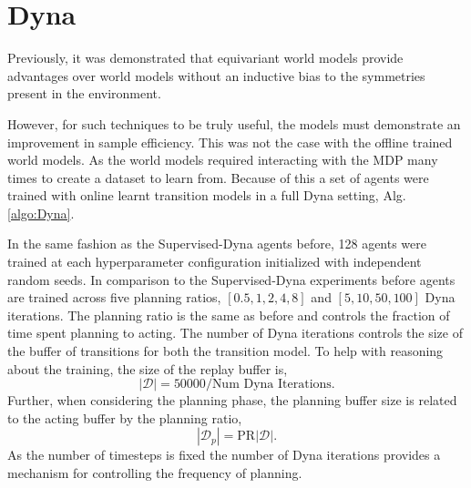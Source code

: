 \section{Dyna}\label{sec:Dyna_experiment}
Previously, it was demonstrated that equivariant world models provide advantages over world models without an inductive bias to the symmetries present in the environment.

However, for such techniques to be truly useful, the models must demonstrate an improvement in sample efficiency. This was not the case with the offline trained world models. As the world models required interacting with the MDP many times to create a dataset to learn from. Because of this a set of agents were trained with online learnt transition models in a full Dyna setting, Alg.\ref{algo:Dyna}.

In the same fashion as the Supervised-Dyna agents before, 128 agents were trained at each hyperparameter configuration initialized with independent random seeds. In comparison to the Supervised-Dyna experiments before agents are trained across five planning ratios, $[0.5, 1, 2, 4, 8]$ and $[5, 10, 50, 100]$ Dyna iterations. The planning ratio is the same as before and controls the fraction of time spent planning to acting. The number of Dyna iterations controls the size of the buffer of transitions for both the transition model. To help with reasoning about the training, the size of the replay buffer is,
\begin{equation}
	|\mathcal{D}| = 50000/\text{Num Dyna Iterations}.
\end{equation}
Further, when considering the planning phase, the planning buffer size is related to the acting buffer by the planning ratio,
\begin{equation}
	|\mathcal{D}_p| = \text{PR}|\mathcal{D}|.
\end{equation}
As the number of timesteps is fixed the number of Dyna iterations provides a mechanism for controlling the frequency of planning.
